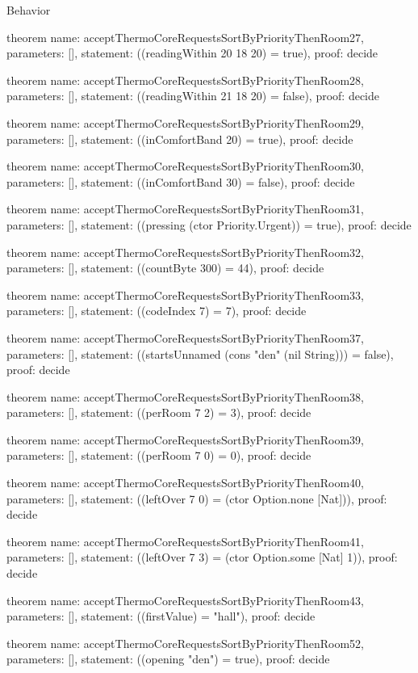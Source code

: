 \begin{lexlean}{Behavior}
\begin{semanticmodule}
theorem{
  name: acceptThermoCoreRequestsSortByPriorityThenRoom27,
  parameters: [],
  statement: ((readingWithin 20 18 20) = true),
  proof: decide{}
}

theorem{
  name: acceptThermoCoreRequestsSortByPriorityThenRoom28,
  parameters: [],
  statement: ((readingWithin 21 18 20) = false),
  proof: decide{}
}

theorem{
  name: acceptThermoCoreRequestsSortByPriorityThenRoom29,
  parameters: [],
  statement: ((inComfortBand 20) = true),
  proof: decide{}
}

theorem{
  name: acceptThermoCoreRequestsSortByPriorityThenRoom30,
  parameters: [],
  statement: ((inComfortBand 30) = false),
  proof: decide{}
}

theorem{
  name: acceptThermoCoreRequestsSortByPriorityThenRoom31,
  parameters: [],
  statement: ((pressing (ctor Priority.Urgent)) = true),
  proof: decide{}
}

theorem{
  name: acceptThermoCoreRequestsSortByPriorityThenRoom32,
  parameters: [],
  statement: ((countByte 300) = 44),
  proof: decide{}
}

theorem{
  name: acceptThermoCoreRequestsSortByPriorityThenRoom33,
  parameters: [],
  statement: ((codeIndex 7) = 7),
  proof: decide{}
}

theorem{
  name: acceptThermoCoreRequestsSortByPriorityThenRoom37,
  parameters: [],
  statement: ((startsUnnamed (cons "den" (nil String))) = false),
  proof: decide{}
}

theorem{
  name: acceptThermoCoreRequestsSortByPriorityThenRoom38,
  parameters: [],
  statement: ((perRoom 7 2) = 3),
  proof: decide{}
}

theorem{
  name: acceptThermoCoreRequestsSortByPriorityThenRoom39,
  parameters: [],
  statement: ((perRoom 7 0) = 0),
  proof: decide{}
}

theorem{
  name: acceptThermoCoreRequestsSortByPriorityThenRoom40,
  parameters: [],
  statement: ((leftOver 7 0) = (ctor Option.none [Nat])),
  proof: decide{}
}

theorem{
  name: acceptThermoCoreRequestsSortByPriorityThenRoom41,
  parameters: [],
  statement: ((leftOver 7 3) = (ctor Option.some [Nat] 1)),
  proof: decide{}
}

theorem{
  name: acceptThermoCoreRequestsSortByPriorityThenRoom43,
  parameters: [],
  statement: ((firstValue) = "hall"),
  proof: decide{}
}

theorem{
  name: acceptThermoCoreRequestsSortByPriorityThenRoom52,
  parameters: [],
  statement: ((opening "den") = true),
  proof: decide{}
}


\end{semanticmodule}
\end{lexlean}
